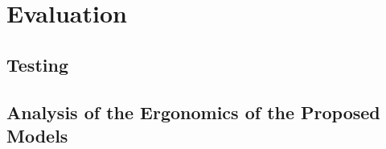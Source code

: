 
\chapter{Evaluation}
\label{chap:evaluation}

\section{Testing}

\section{Analysis of the Ergonomics of the Proposed Models}

